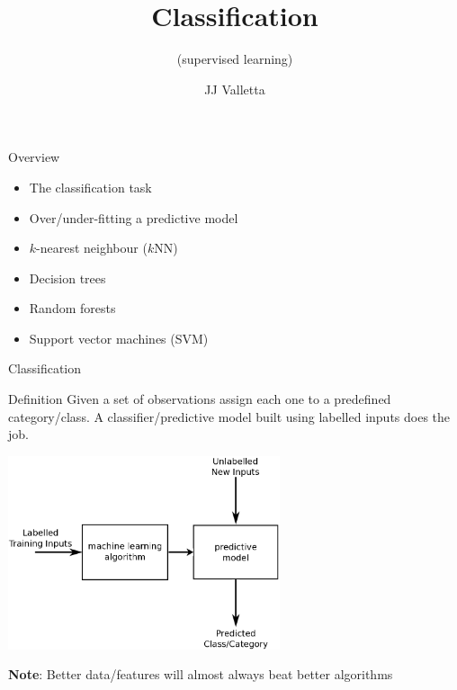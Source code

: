 \documentclass[pdf]{beamer}
\title{Classification}
\subtitle{(supervised learning)}
\author{JJ Valletta}
\newif\ifplacelogo %
\begin{document}
\begin{frame}
\titlepage
\end{frame}
\placelogofalse %
\begin{frame}{Overview}
\begin{itemize}\addtolength{\itemsep}{0.5\baselineskip}
	\item<2-> The classification task
	\item<3-> Over/under-fitting a predictive model
 	\item<4-> $k$-nearest neighbour ($k$NN)
	\item<5-> Decision trees
	\item<6-> Random forests
	\item<7-> Support vector machines (SVM)
\end{itemize}
\end{frame}
\begin{frame}{Classification}
\begin{block}{Definition}
Given a set of observations assign each one to a predefined category/class. A classifier/predictive model built
using labelled inputs does the job.
\end{block}
\vfill
\begin{center}
	\includegraphics[width=0.6\textwidth]{classification.png}
\end{center}
\vfill
\textbf{Note}: Better data/features will almost always beat better algorithms
\end{frame}
\end{document}
